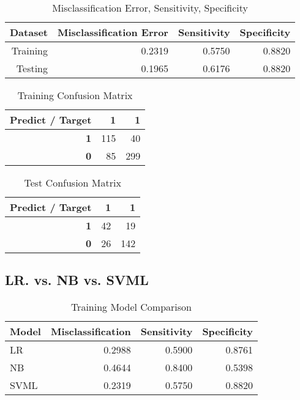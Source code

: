 \documentclass[12pt, letterpaper]{report}
\begin{document}
\begin{table}[H]
	\centering
	\begin{tabular}{ |r|r|r|r| }
		\hline
		\textbf{Dataset} & \textbf{Misclassification Error} & \textbf{Sensitivity} & \textbf{Specificity}\\
		\hline
		Training & 0.2319 & 0.5750 & 0.8820 \\
		\hline
		Testing & 0.1965 & 0.6176 & 0.8820 \\
		\hline
	\end{tabular}
	\caption{Misclassification Error, Sensitivity, Specificity}
\end{table}

\begin{table}[H]
	\centering
	\begin{tabular}{ |r|r|r| }
		\hline
		\textbf{Predict / Target} & \textbf{1} & \textbf{1} \\
		\hline
		\textbf{1} & 115 & 40 \\
		\hline
		\textbf{0} & 85 & 299 \\
		\hline
	\end{tabular}
	\caption{Training Confusion Matrix}
\end{table}

\begin{table}[H]
	\centering
	\begin{tabular}{ |r|r|r| }
		\hline
		\textbf{Predict / Target} & \textbf{1} & \textbf{1} \\
		\hline
		\textbf{1} & 42 & 19 \\
		\hline
		\textbf{0} & 26 & 142 \\
		\hline
	\end{tabular}
	\caption{Test Confusion Matrix}
\end{table}

\subsection{LR. vs. NB vs. SVML}

\begin{table}[H]
	\centering
	\begin{tabular}{ |l|r|r|r| }
		\hline
		\textbf{Model} & \textbf{Misclassification} & \textbf{Sensitivity} & \textbf{Specificity} \\
		\hline
		LR & 0.2988 & 0.5900 & 0.8761 \\
		\hline
		NB & 0.4644 & 0.8400 & 0.5398 \\
		\hline
		SVML & 0.2319 & 0.5750 & 0.8820 \\
		\hline
	\end{tabular}
	\caption{Training Model Comparison}
\end{table}
\end{document}
